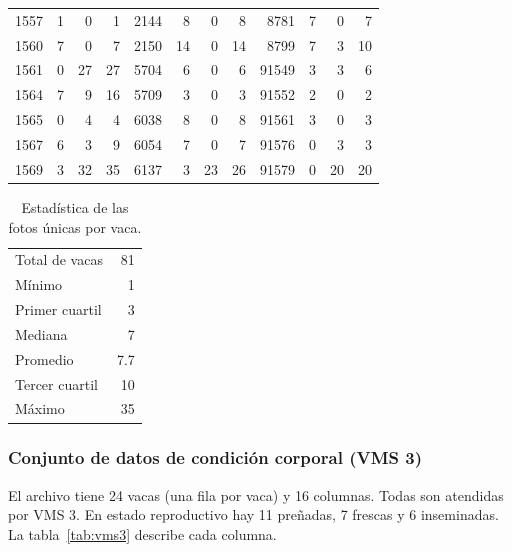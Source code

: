 \begin{table}[H]
\begin{tabular}{rrrr@{\hspace{1.5em}}rrrr@{\hspace{1.5em}}rrrr}
    1557 & 1 & 0 & 1 & 2144 & 8 & 0 & 8 & 8781 & 7 & 0 & 7 \\
    1560 & 7 & 0 & 7 & 2150 & 14 & 0 & 14 & 8799 & 7 & 3 & 10 \\
    1561 & 0 & 27 & 27 & 5704 & 6 & 0 & 6 & 91549 & 3 & 3 & 6 \\
    1564 & 7 & 9 & 16 & 5709 & 3 & 0 & 3 & 91552 & 2 & 0 & 2 \\
    1565 & 0 & 4 & 4 & 6038 & 8 & 0 & 8 & 91561 & 3 & 0 & 3 \\
    1567 & 6 & 3 & 9 & 6054 & 7 & 0 & 7 & 91576 & 0 & 3 & 3 \\
    1569 & 3 & 32 & 35 & 6137 & 3 & 23 & 26 & 91579 & 0 & 20 & 20 \\
    \bottomrule
  \end{tabular}
\end{table}

\begin{table}[H]
  \centering
  \caption{Estadística de las fotos únicas por vaca.}
  \label{tab:fotos-stats}
  \begin{tabular}{lr}
    \toprule
    Total de vacas & 81 \\
    Mínimo & 1 \\
    Primer cuartil & 3 \\
    Mediana & 7 \\
    Promedio & 7.7 \\
    Tercer cuartil & 10 \\
    Máximo & 35 \\
    \bottomrule
  \end{tabular}
\end{table}

\subsubsection*{Conjunto de datos de condición corporal (VMS 3)}

El archivo tiene 24 vacas (una fila por vaca) y 16 columnas. Todas son atendidas por VMS 3. En estado reproductivo hay 11 preñadas, 7 frescas y 6 inseminadas. La tabla~\ref{tab:vms3} describe cada columna.

